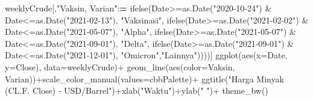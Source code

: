 \documentclass[
]{book}
\newenvironment{Shaded}{\begin{snugshade}}{\end{snugshade}}
\newcommand{\AttributeTok}[1]{\textcolor[rgb]{0.77,0.63,0.00}{#1}}
\newcommand{\ErrorTok}[1]{\textcolor[rgb]{0.64,0.00,0.00}{\textbf{#1}}}
\newcommand{\FunctionTok}[1]{\textcolor[rgb]{0.00,0.00,0.00}{#1}}
\newcommand{\NormalTok}[1]{#1}
\newcommand{\SpecialCharTok}[1]{\textcolor[rgb]{0.00,0.00,0.00}{#1}}
\newcommand{\StringTok}[1]{\textcolor[rgb]{0.31,0.60,0.02}{#1}}
\begin{document}
\begin{Shaded}
\begin{Highlighting}[]
\NormalTok{weeklyCrude[,}\StringTok{"Vaksin, Varian"}\SpecialCharTok{:}\ErrorTok{=}
              \FunctionTok{ifelse}\NormalTok{(Date}\SpecialCharTok{\textgreater{}=}\FunctionTok{as.Date}\NormalTok{(}\StringTok{"2020{-}10{-}24"}\NormalTok{) }\SpecialCharTok{\&}\NormalTok{ Date}\SpecialCharTok{\textless{}=}\FunctionTok{as.Date}\NormalTok{(}\StringTok{"2021{-}02{-}13"}\NormalTok{),}
                     \StringTok{"Vaksinasi"}\NormalTok{,}
              \FunctionTok{ifelse}\NormalTok{(Date}\SpecialCharTok{\textgreater{}=}\FunctionTok{as.Date}\NormalTok{(}\StringTok{"2021{-}02{-}02"}\NormalTok{) }\SpecialCharTok{\&}\NormalTok{ Date}\SpecialCharTok{\textless{}=}\FunctionTok{as.Date}\NormalTok{(}\StringTok{"2021{-}05{-}07"}\NormalTok{),}
                     \StringTok{"Alpha"}\NormalTok{,}
              \FunctionTok{ifelse}\NormalTok{(Date}\SpecialCharTok{\textgreater{}=}\FunctionTok{as.Date}\NormalTok{(}\StringTok{"2021{-}05{-}07"}\NormalTok{) }\SpecialCharTok{\&}\NormalTok{ Date}\SpecialCharTok{\textless{}=}\FunctionTok{as.Date}\NormalTok{(}\StringTok{"2021{-}09{-}01"}\NormalTok{),}
                     \StringTok{"Delta"}\NormalTok{,}
              \FunctionTok{ifelse}\NormalTok{(Date}\SpecialCharTok{\textgreater{}=}\FunctionTok{as.Date}\NormalTok{(}\StringTok{"2021{-}09{-}01"}\NormalTok{) }\SpecialCharTok{\&}\NormalTok{ Date}\SpecialCharTok{\textless{}=}\FunctionTok{as.Date}\NormalTok{(}\StringTok{"2021{-}12{-}01"}\NormalTok{),}
                     \StringTok{"Omicron"}\NormalTok{,}\StringTok{"Lainnya"}\NormalTok{))))]}
\FunctionTok{ggplot}\NormalTok{(}\FunctionTok{aes}\NormalTok{(}\AttributeTok{x=}\NormalTok{Date, }\AttributeTok{y=}\NormalTok{Close),}
       \AttributeTok{data=}\NormalTok{weeklyCrude)}\SpecialCharTok{+}
  \FunctionTok{geom\_line}\NormalTok{(}\FunctionTok{aes}\NormalTok{(}\AttributeTok{color=}\StringTok{\textasciigrave{}}\AttributeTok{Vaksin, Varian}\StringTok{\textasciigrave{}}\NormalTok{))}\SpecialCharTok{+}\FunctionTok{scale\_color\_manual}\NormalTok{(}\AttributeTok{values=}\NormalTok{cbbPalette)}\SpecialCharTok{+}
  \FunctionTok{ggtitle}\NormalTok{(}\StringTok{"Harga Minyak (CL.F. Close) {-} USD/Barrel"}\NormalTok{)}\SpecialCharTok{+}\FunctionTok{xlab}\NormalTok{(}\StringTok{"Waktu"}\NormalTok{)}\SpecialCharTok{+}\FunctionTok{ylab}\NormalTok{(}\StringTok{" "}\NormalTok{)}\SpecialCharTok{+}
  \FunctionTok{theme\_bw}\NormalTok{()}
\end{Highlighting}
\end{Shaded}
\end{document}
